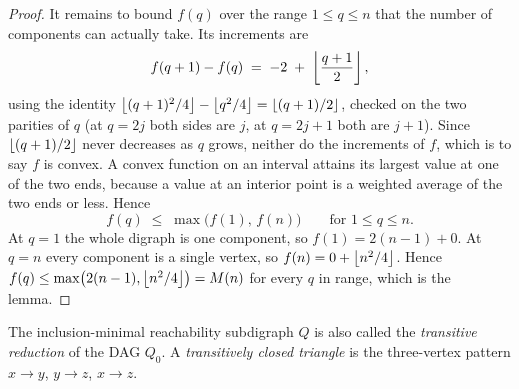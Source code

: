 \begin{proof}
It remains to bound $f(q)$ over the range $1 \le q \le n$ that the number of components can actually take. Its increments are
\[
    f(q+1) - f(q) \;=\; -2 \;+\; \left\lfloor \frac{q+1}{2} \right\rfloor,
\]
using the identity $\left\lfloor (q+1)^2/4 \right\rfloor - \left\lfloor q^2/4 \right\rfloor = \left\lfloor (q+1)/2 \right\rfloor$, checked on the two parities of $q$ (at $q = 2j$ both sides are $j$, at $q = 2j+1$ both are $j+1$). Since $\left\lfloor (q+1)/2 \right\rfloor$ never decreases as $q$ grows, neither do the increments of $f$, which is to say $f$ is convex. A convex function on an interval attains its largest value at one of the two ends, because a value at an interior point is a weighted average of the two ends or less. Hence
\[
    f(q) \;\le\; \max\bigl(f(1),\,f(n)\bigr) \qquad \text{for } 1 \le q \le n.
\]
At $q=1$ the whole digraph is one component, so $f(1) = 2(n-1) + 0$. At $q=n$ every component is a single vertex, so $f(n) = 0 + \left\lfloor n^2/4 \right\rfloor$. Hence $f(q) \le \max\bigl(2(n-1), \left\lfloor n^2/4 \right\rfloor\bigr) = M(n)$ for every $q$ in range, which is the lemma.
\end{proof}

The inclusion-minimal reachability subdigraph $Q$ is also called the
\emph{transitive reduction} of the DAG $Q_0$. A \emph{transitively closed
triangle} is the three-vertex pattern $x\to y$, $y\to z$, $x\to z$.

